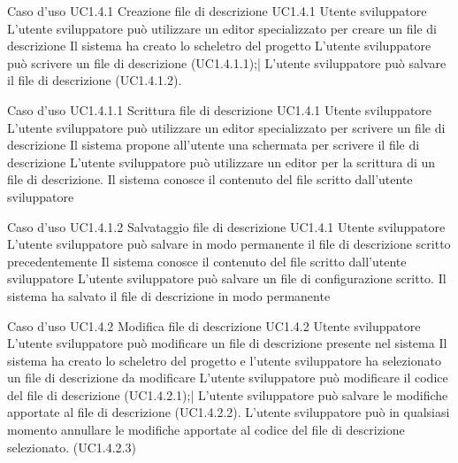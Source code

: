 \UCtitle
{Caso d'uso UC1.4.1}
{Creazione file di descrizione}
\UC
{UC1.4.1}
{Utente sviluppatore}
{L'utente sviluppatore può utilizzare un editor specializzato per creare un file di descrizione}
{Il sistema ha creato lo scheletro del progetto}
\scenario
{L'utente sviluppatore può scrivere un file di descrizione (UC1.4.1.1);|
L'utente sviluppatore può salvare il file di descrizione (UC1.4.1.2).
}

\UCtitle
{Caso d'uso UC1.4.1.1}
{Scrittura file di descrizione}
\UC
{UC1.4.1}
{Utente sviluppatore}
{L'utente sviluppatore può utilizzare un editor specializzato per scrivere un file di descrizione}
{Il sistema propone all'utente una schermata per scrivere il file di descrizione}
\scenario
{L'utente sviluppatore può utilizzare un editor per la scrittura di un file di descrizione.}
\post
{Il sistema conosce il contenuto del file scritto dall'utente sviluppatore}

\UCtitle
{Caso d'uso UC1.4.1.2}
{Salvataggio file di descrizione}
\UC
{UC1.4.1}
{Utente sviluppatore}
{L'utente sviluppatore può salvare in modo permanente il file di descrizione scritto precedentemente}
{Il sistema conosce il contenuto del file scritto dall'utente sviluppatore}
\scenario
{L'utente sviluppatore può salvare un file di configurazione scritto.}
\post
{Il sistema ha salvato il file di descrizione in modo permanente}

\UCtitle
{Caso d'uso UC1.4.2}
{Modifica file di descrizione}
\UC
{UC1.4.2}
{Utente sviluppatore}
{L'utente sviluppatore può modificare un file di descrizione presente nel sistema}
{Il sistema ha creato lo scheletro del progetto e l'utente sviluppatore ha selezionato un file di descrizione da modificare}
\scenario
{L'utente sviluppatore può modificare il codice del file di descrizione (UC1.4.2.1);|
L'utente sviluppatore può salvare le modifiche apportate al file di descrizione (UC1.4.2.2).
}
\estensioni
{L'utente sviluppatore può in qualsiasi momento annullare le modifiche apportate al codice del file di descrizione selezionato. (UC1.4.2.3)
}

